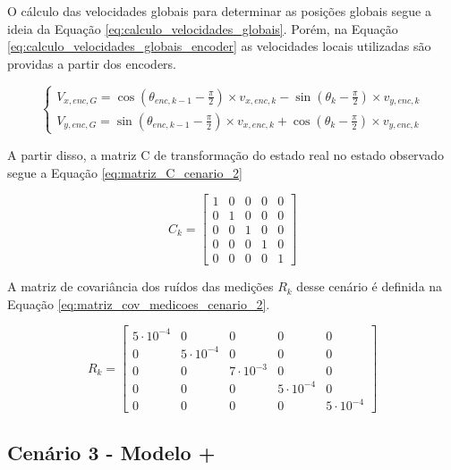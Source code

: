 \documentclass[acronym, symbols, table]{fei}
\begin{document}
			O cálculo das velocidades globais para determinar as posições globais segue a ideia da Equação \ref{eq:calculo_velocidades_globais}. Porém, na Equação \ref{eq:calculo_velocidades_globais_encoder} as velocidades locais utilizadas são providas a partir dos encoders.
			
				\begin{equation}\label{eq:calculo_velocidades_globais_encoder}
					\begin{cases}
						V_{x,enc,G} = \cos(\theta_{enc,k-1} - \frac{\pi}{2}) \times v_{x,enc,k} - \sin(\theta_{k} - \frac{\pi}{2}) \times v_{y,enc,k} \\
						V_{y,enc,G} = \sin(\theta_{enc,k-1} - \frac{\pi}{2}) \times v_{x,enc,k} + \cos(\theta_{k} - \frac{\pi}{2}) \times v_{y,enc,k}
					\end{cases}
				\end{equation}
			
			A partir disso, a matriz C de transformação do estado real no estado observado segue a Equação \ref{eq:matriz_C_cenario_2}
			
			\begin{equation}\label{eq:matriz_C_cenario_2}
				C_{k} = \begin{bmatrix}
					1 & 0 & 0 & 0 & 0 \\
					0 & 1 & 0 & 0 & 0 \\
					0 & 0 & 1 & 0 & 0 \\
					0 & 0 & 0 & 1 & 0 \\
					0 & 0 & 0 & 0 & 1
				\end{bmatrix}
			\end{equation}
			
			A matriz de covariância dos ruídos das medições $R_{k}$ desse cenário é definida na Equação \ref{eq:matriz_cov_medicoes_cenario_2}.
			
			\begin{equation}\label{eq:matriz_cov_medicoes_cenario_2}
				R_{k} = \begin{bmatrix}
					5\cdot10^{-4} & 0 & 0 & 0 & 0 \\
					0 & 5\cdot10^{-4} & 0 & 0 & 0 \\
					0 & 0 & 7\cdot10^{-3} & 0 & 0 \\
					0 & 0 & 0 & 5\cdot10^{-4} & 0 \\
					0 & 0 & 0 & 0 & 5\cdot10^{-4}
				\end{bmatrix}
			\end{equation}
		
		\subsection{Cenário 3 - Modelo + } \label{sec:implementacao_cenario_3}
		
\end{document}
